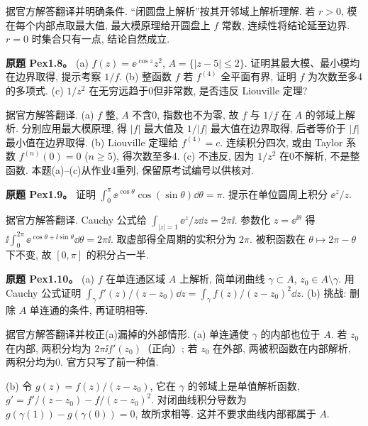\begin{solution}据官方解答翻译并明确条件. “闭圆盘上解析”按其开邻域上解析理解. 若 $r>0$, 模在每个内部点取最大值, 最大模原理给开圆盘上 $f$ 常数, 连续性将结论延至边界. $r=0$ 时集合只有一点, 结论自然成立.\end{solution}
\begin{exercise}\label{ass:pex1-8}
\textbf{原题 Pex1.8。} (a) $f(z)=\ee^{\cos z}z^2$, $A=\{|z-5|\le2\}$. 证明其最大模、最小模均在边界取得, 提示考察 $1/f$. (b) 整函数 $f$ 若 $f^{(4)}$ 全平面有界, 证明 $f$ 为次数至多4的多项式. (c) $1/z^2$ 在无穷远趋于0但非常数, 是否违反 Liouville 定理?
\end{exercise}
\begin{solution}
据官方解答翻译. (a) $f$ 整, $A$ 不含0, 指数也不为零, 故 $f$ 与 $1/f$ 在 $A$ 的邻域上解析. 分别应用最大模原理, 得 $|f|$ 最大值及 $1/|f|$ 最大值在边界取得, 后者等价于 $|f|$ 最小值在边界取得. (b) Liouville 定理给 $f^{(4)}=c$. 连续积分四次, 或由 Taylor 系数 $f^{(n)}(0)=0$ ($n\ge5$), 得次数至多4. (c) 不违反, 因为 $1/z^2$ 在0不解析, 不是整函数. 本题(a)--(c)从作业4重列, 保留原考试编号以供核对.
\end{solution}
\begin{exercise}\label{ass:pex1-9}
\textbf{原题 Pex1.9。} 证明 $\int_0^\pi\ee^{\cos\theta}\cos(\sin\theta)\dd\theta=\pi$. 提示在单位圆周上积分 $\ee^z/z$.
\end{exercise}
\begin{solution}
据官方解答翻译. Cauchy 公式给 $\int_{|z|=1}\ee^z/z\dd z=2\pi\ii$. 参数化 $z=\ee^{\ii\theta}$ 得 $\ii\int_0^{2\pi}\ee^{\cos\theta+\ii\sin\theta}\dd\theta=2\pi\ii$. 取虚部得全周期的实积分为 $2\pi$. 被积函数在 $\theta\mapsto2\pi-\theta$ 下不变, 故 $[0,\pi]$ 的积分占一半.
\end{solution}
\begin{exercise}\label{ass:pex1-10}
\textbf{原题 Pex1.10。} (a) $f$ 在单连通区域 $A$ 上解析, 简单闭曲线 $\gamma\subset A$, $z_0\in A\setminus\gamma$. 用 Cauchy 公式证明 $\int_\gamma f'(z)/(z-z_0)\dd z=\int_\gamma f(z)/(z-z_0)^2\dd z$. (b) 挑战: 删除 $A$ 单连通的条件, 再证明相等.
\end{exercise}
\begin{solution}
据官方解答翻译并校正(a)漏掉的外部情形. (a) 单连通使 $\gamma$ 的内部也位于 $A$. 若 $z_0$ 在内部, 两积分均为 $2\pi\ii f'(z_0)$（正向）; 若 $z_0$ 在外部, 两被积函数在内部解析, 两积分均为0. 官方只写了前一种值.

(b) 令 $g(z)=f(z)/(z-z_0)$, 它在 $\gamma$ 的邻域上是单值解析函数, $g'=f'/(z-z_0)-f/(z-z_0)^2$. 对闭曲线积分导数为 $g(\gamma(1))-g(\gamma(0))=0$, 故所求相等. 这并不要求曲线内部都属于 $A$.
\end{solution}
